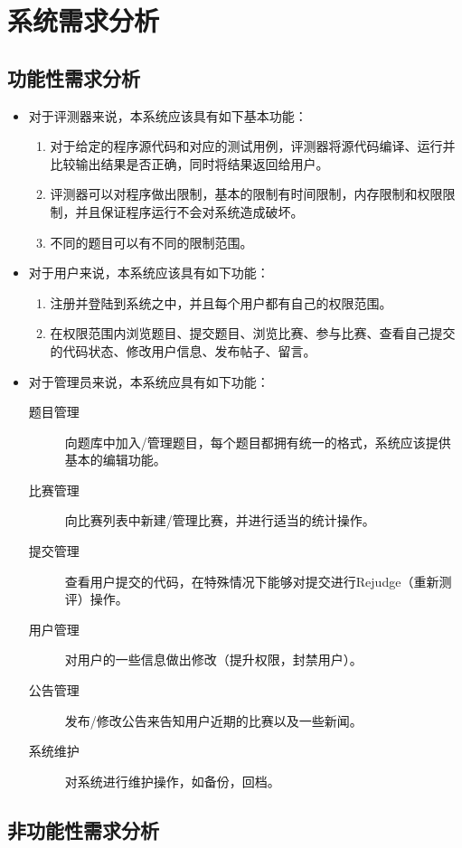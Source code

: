 
\chapter{系统需求分析}
\section{功能性需求分析}
\begin{itemize}
\item 对于评测器来说，本系统应该具有如下基本功能：
\begin{enumerate}
	\item 对于给定的程序源代码和对应的测试用例，评测器将源代码编译、运行并比较输出结果是否正确，同时将结果返回给用户。
	\item 评测器可以对程序做出限制，基本的限制有时间限制，内存限制和权限限制，并且保证程序运行不会对系统造成破坏。
	\item 不同的题目可以有不同的限制范围。
\end{enumerate}
\item 对于用户来说，本系统应该具有如下功能：
\begin{enumerate}
	\item 注册并登陆到系统之中，并且每个用户都有自己的权限范围。
	\item 在权限范围内浏览题目、提交题目、浏览比赛、参与比赛、查看自己提交的代码状态、修改用户信息、发布帖子、留言。
\end{enumerate}
\item 对于管理员来说，本系统应具有如下功能：
\begin{description}
	\item[题目管理] 向题库中加入/管理题目，每个题目都拥有统一的格式，系统应该提供基本的编辑功能。
	\item[比赛管理] 向比赛列表中新建/管理比赛，并进行适当的统计操作。
	\item[提交管理] 查看用户提交的代码，在特殊情况下能够对提交进行Rejudge（重新测评）操作。
	\item[用户管理] 对用户的一些信息做出修改（提升权限，封禁用户）。
	\item[公告管理] 发布/修改公告来告知用户近期的比赛以及一些新闻。
	\item[系统维护] 对系统进行维护操作，如备份，回档。
\end{description}
\end{itemize}

\section{非功能性需求分析}
